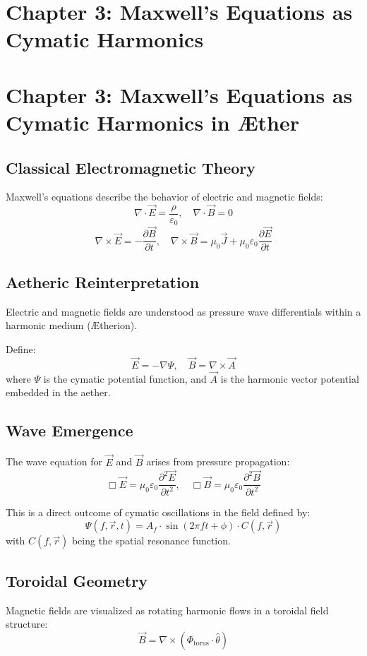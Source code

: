 \documentclass[12pt]{book}
\begin{document}
\section*{Chapter 3: Maxwell’s Equations as Cymatic Harmonics}


\section*{Chapter 3: Maxwell’s Equations as Cymatic Harmonics in Æther}

\subsection*{Classical Electromagnetic Theory}
Maxwell's equations describe the behavior of electric and magnetic fields:
\[
\nabla \cdot \vec{E} = \frac{\rho}{\varepsilon_0}, \quad
\nabla \cdot \vec{B} = 0
\]
\[
\nabla \times \vec{E} = -\frac{\partial \vec{B}}{\partial t}, \quad
\nabla \times \vec{B} = \mu_0 \vec{J} + \mu_0 \varepsilon_0 \frac{\partial \vec{E}}{\partial t}
\]

\subsection*{Aetheric Reinterpretation}
Electric and magnetic fields are understood as pressure wave differentials within a harmonic medium (Ætherion).

Define:
\[
\vec{E} = -\nabla \Psi, \quad \vec{B} = \nabla \times \vec{A}
\]
where $\Psi$ is the cymatic potential function, and $\vec{A}$ is the harmonic vector potential embedded in the aether.

\subsection*{Wave Emergence}
The wave equation for $\vec{E}$ and $\vec{B}$ arises from pressure propagation:
\[
\Box \vec{E} = \mu_0 \varepsilon_0 \frac{\partial^2 \vec{E}}{\partial t^2}, \quad
\Box \vec{B} = \mu_0 \varepsilon_0 \frac{\partial^2 \vec{B}}{\partial t^2}
\]

This is a direct outcome of cymatic oscillations in the field defined by:
\[
\Psi(f, \vec{r}, t) = A_f \cdot \sin(2\pi f t + \phi) \cdot C(f, \vec{r})
\]
with $C(f, \vec{r})$ being the spatial resonance function.

\subsection*{Toroidal Geometry}
Magnetic fields are visualized as rotating harmonic flows in a toroidal field structure:
\[
\vec{B} = \nabla \times (\Phi_{\text{torus}} \cdot \hat{\theta})
\]
\end{document}
